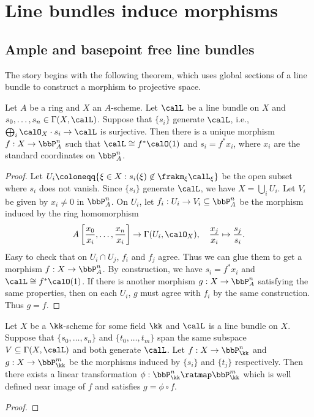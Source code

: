 \section{Line bundles induce morphisms}


\subsection{Ample and basepoint free line bundles}

    The story begins with the following theorem, which uses global sections of a line bundle to construct a morphism to projective space.

    \begin{theorem}\label{thm:morphism_to_projective_space}
        Let \(A\) be a ring and \(X\) an \(A\)-scheme.
        Let \(\calL\) be a line bundle on \(X\) and \(s_0,\ldots,s_n\in\Gamma(X,\calL)\).
        Suppose that \(\{s_i\}\) generate \(\calL\), i.e., \(\bigoplus_i \calO_X\cdot s_i \to \calL\) is surjective.
        Then there is a unique morphism \(f:X\to \bbP^n_A\) such that \(\calL\cong f^*\calO(1)\) and \(s_i=f^*x_i\), where \(x_i\) are the standard coordinates on \(\bbP^n_A\).   
    \end{theorem}
    \begin{proof}
        Let \(U_i\coloneqq \{\xi \in X: s_i(\xi) \not\in \frakm_\xi \calL_\xi\}\) be the open subset where \(s_i\) does not vanish.
        Since \(\{s_i\}\) generate \(\calL\), we have \(X=\bigcup_i U_i\).
        Let \(V_i\) be given by \(x_i \neq 0\) in \(\bbP^n_A\).
        On \(U_i\), let \(f_i:U_i\to V_i \subseteq \bbP^n_A\) be the morphism induced by the ring homomorphism
        \[ A\left[\frac{x_0}{x_i},\ldots,\frac{x_n}{x_i}\right] \to \Gamma(U_i,\calO_X), \quad \frac{x_j}{x_i} \mapsto \frac{s_j}{s_i}. \]
        Easy to check that on \(U_i\cap U_j\), \(f_i\) and \(f_j\) agree.
        Thus we can glue them to get a morphism \(f:X\to \bbP^n_A\).
        By construction, we have \(s_i=f^*x_i\) and \(\calL\cong f^*\calO(1)\).
        If there is another morphism \(g:X\to \bbP^n_A\) satisfying the same properties, then on each \(U_i\), \(g\) must agree with \(f_i\) by the same construction.
        Thus \(g=f\).
    \end{proof}

    \begin{proposition}\label{prop:different_choices_of_sections_give_different_morphisms_which_differ_by_a_linear_transformation}
        Let \(X\) be a \(\kk\)-scheme for some field \(\kk\) and \(\calL\) is a line bundle on \(X\).
        Suppose that \(\{s_0,\ldots,s_n\}\) and \(\{t_0,\ldots,t_m\}\) span the same subspace \(V\subseteq \Gamma(X,\calL)\) and both generate \(\calL\).
        Let \(f:X\to \bbP^n_\kk\) and \(g:X\to \bbP^m_\kk\) be the morphisms induced by \(\{s_i\}\) and \(\{t_j\}\) respectively.
        Then there exists a linear transformation \(\phi:\bbP^n_\kk \ratmap \bbP^m_\kk\) which is well defined near image of \(f\) and satisfies \(g=\phi \circ f\).
    \end{proposition}
    \begin{proof}
        
    \end{proof}

